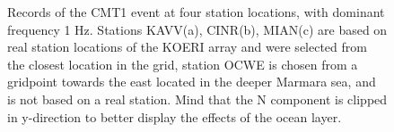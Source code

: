 \documentclass[../Text/00main.tex]{subfiles}
\begin{document}
\begin{figure}[htb!]%
    \centering
    \qquad
    \caption{Records of the CMT1 event at four station locations, with dominant frequency 1 Hz. Stations KAVV(a), CINR(b), MIAN(c) are based on real station locations of the KOERI array and were selected from the closest location in the grid, station OCWE is chosen from a gridpoint towards the east located in the deeper Marmara sea, and is not based on a real station. Mind that the N component is clipped in y-direction to better display the effects of the ocean layer.}%
    \label{fig:CINRrecord_ref}%
\end{figure}
\end{document}
